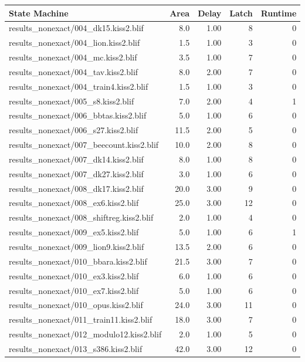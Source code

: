 \begin{table}[h]
\centering
	\begin{tabular}{|l|r|r|r|r|}
	\hline
		\textbf{State Machine} & \textbf{Area} & \textbf{Delay} & \textbf{Latch} & \textbf{Runtime}\\
		\hline
results\_nonexact/004\_dk15.kiss2.blif & 8.0 & 1.00 & 8 & 0 \\
results\_nonexact/004\_lion.kiss2.blif & 1.5 & 1.00 & 3 & 0 \\
results\_nonexact/004\_mc.kiss2.blif & 3.5 & 1.00 & 7 & 0 \\
results\_nonexact/004\_tav.kiss2.blif & 8.0 & 2.00 & 7 & 0 \\
results\_nonexact/004\_train4.kiss2.blif & 1.5 & 1.00 & 3 & 0 \\
results\_nonexact/005\_s8.kiss2.blif & 7.0 & 2.00 & 4 & 1 \\
results\_nonexact/006\_bbtas.kiss2.blif & 5.0 & 1.00 & 6 & 0 \\
results\_nonexact/006\_s27.kiss2.blif & 11.5 & 2.00 & 5 & 0 \\
results\_nonexact/007\_beecount.kiss2.blif & 10.0 & 2.00 & 8 & 0 \\
results\_nonexact/007\_dk14.kiss2.blif & 8.0 & 1.00 & 8 & 0 \\
results\_nonexact/007\_dk27.kiss2.blif & 3.0 & 1.00 & 6 & 0 \\
results\_nonexact/008\_dk17.kiss2.blif & 20.0 & 3.00 & 9 & 0 \\
results\_nonexact/008\_ex6.kiss2.blif & 25.0 & 3.00 & 12 & 0 \\
results\_nonexact/008\_shiftreg.kiss2.blif & 2.0 & 1.00 & 4 & 0 \\
results\_nonexact/009\_ex5.kiss2.blif & 5.0 & 1.00 & 6 & 1 \\
results\_nonexact/009\_lion9.kiss2.blif & 13.5 & 2.00 & 6 & 0 \\
results\_nonexact/010\_bbara.kiss2.blif & 21.5 & 3.00 & 7 & 0 \\
results\_nonexact/010\_ex3.kiss2.blif & 6.0 & 1.00 & 6 & 0 \\
results\_nonexact/010\_ex7.kiss2.blif & 5.0 & 1.00 & 6 & 0 \\
results\_nonexact/010\_opus.kiss2.blif & 24.0 & 3.00 & 11 & 0 \\
results\_nonexact/011\_train11.kiss2.blif & 18.0 & 3.00 & 7 & 0 \\
results\_nonexact/012\_modulo12.kiss2.blif & 2.0 & 1.00 & 5 & 0 \\
results\_nonexact/013\_s386.kiss2.blif & 42.0 & 3.00 & 12 & 0 \\

\end{tabular}
\end{table}
